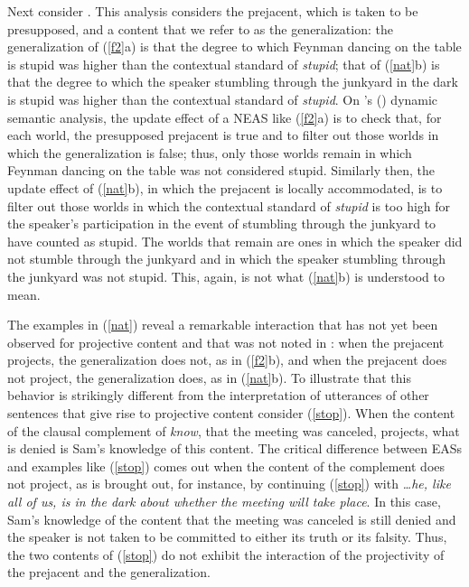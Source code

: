 \documentclass[11pt,fleqn]{article}
\newcommand{\6}{\mbox{$[\hspace*{-.6mm}[$}}
\newcommand{\9}{\mbox{$]\hspace*{-.6mm}]$}}
\newcommand{\citetpos}[1]{\citeauthor{#1}'s (\citeyear{#1})}
\begin{document}
Next consider \citealt{barker02}. This analysis considers the prejacent, which is taken to be presupposed, and a content that we refer to as the generalization: the generalization of (\ref{f2}a) is that the degree to which Feynman dancing on the table is stupid was higher than the contextual standard of {\em stupid}; that of (\ref{nat}b) is that the degree to which the speaker stumbling through the junkyard in the dark is stupid was higher than the contextual standard of {\em stupid}. On \citetpos{barker02} dynamic semantic analysis, the update effect of a NEAS like (\ref{f2}a) is to check that, for each world, the presupposed prejacent is true and to filter out those worlds in which the generalization is false; thus, only those worlds remain in which Feynman dancing on the table was not considered stupid. Similarly then, the update effect of (\ref{nat}b), in which the prejacent is locally accommodated, is to filter out those worlds in which the contextual standard of {\em stupid} is too high for the speaker's participation in the event of stumbling through the junkyard to have counted as stupid. The worlds that remain are ones in which the speaker did not stumble through the junkyard and in which the speaker stumbling through the junkyard was not stupid. This, again, is not what (\ref{nat}b) is understood to mean. 

The examples in (\ref{nat}) reveal a remarkable interaction that has not yet been observed for projective content and that was not noted in \citealt{karttunen-etal2014}: when the prejacent projects, the generalization does not, as in (\ref{f2}b), and when the prejacent does not project, the generalization does, as in (\ref{nat}b). To illustrate that this behavior is strikingly different from the interpretation of utterances of other sentences that give rise to projective content consider  (\ref{stop}). When the content of the clausal complement of {\em know}, that the meeting was canceled, projects, what is denied is Sam's knowledge of this content. The critical difference between EASs and examples like (\ref{stop}) comes out when the content of the complement does not project, as is brought out, for instance, by continuing (\ref{stop}) with {\em \ldots he, like all of us, is in the dark about whether the meeting will take place}. In this case, Sam's knowledge of the content that the meeting was canceled is still denied and the speaker is not taken to be committed to either its truth or its falsity. Thus, the two contents of (\ref{stop}) do not exhibit the interaction of the projectivity of the prejacent and the generalization.
\end{document}
